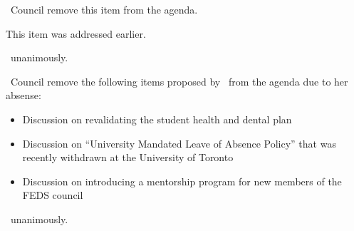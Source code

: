 \begin{motion}
    \birt\ Council remove this item from the agenda. 
    \movers{\seneca}{\brian}

    This item was addressed earlier.

    \carries\ unanimously.
\end{motion}

\begin{motion}
    \birt\ Council remove the following items proposed by \nickta\ from the 
    agenda due to her absense:

    \begin{itemize}
        \item Discussion on revalidating the student health and dental plan
        \item Discussion on ``University Mandated Leave of Absence Policy''
            that was recently withdrawn at the University of Toronto
        \item Discussion on introducing a mentorship program for new members of
            the FEDS council
    \end{itemize}

    \movers{\seneca}{\brian}
    \carries\ unanimously.
\end{motion}


